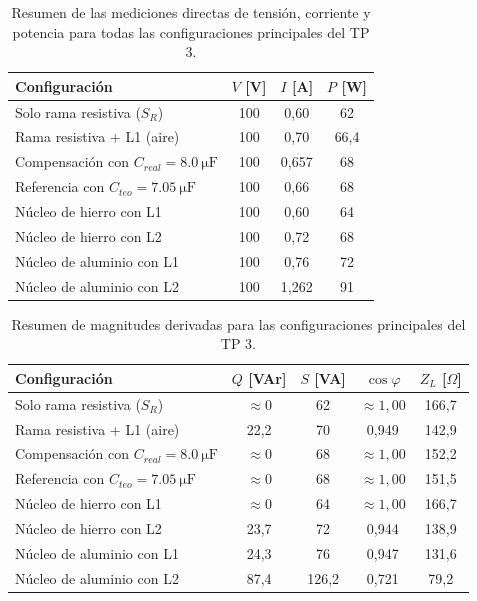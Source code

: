 \documentclass[a4paper,12pt]{article}
\begin{document}
\begin{table}[H]
    \centering
    \caption{Resumen de las mediciones directas de tensión, corriente y potencia para todas las configuraciones principales del TP 3.}
    \label{tab:tp3_resumen_directas}
    \begin{tabular}{>{\raggedright\arraybackslash}p{}ccc}
        \toprule
        Configuración & $V$ [V] & $I$ [A] & $P$ [W] \\
        \midrule
        Solo rama resistiva ($S_R$) & 100 & 0,60 & 62 \\
        Rama resistiva + L1 (aire) & 100 & 0,70 & 66,4 \\
        Compensación con $C_{real}=\SI{8,0}{\micro\farad}$ & 100 & 0,657 & 68 \\
        Referencia con $C_{teo}=\SI{7,05}{\micro\farad}$ & 100 & 0,66 & 68 \\
        Núcleo de hierro con L1 & 100 & 0,60 & 64 \\
        Núcleo de hierro con L2 & 100 & 0,72 & 68 \\
        Núcleo de aluminio con L1 & 100 & 0,76 & 72 \\
        Núcleo de aluminio con L2 & 100 & 1,262 & 91 \\
        \bottomrule
    \end{tabular}
\end{table}

\begin{table}[H]
    \centering
    \caption{Resumen de magnitudes derivadas para las configuraciones principales del TP 3.}
    \label{tab:tp3_resumen_indirectas}
    \begin{tabular}{>{\raggedright\arraybackslash}p{}cccc}
        \toprule
        Configuración & $Q$ [VAr] & $S$ [VA] & $\cos\varphi$ & $Z_L$ [$\Omega$] \\
        \midrule
        Solo rama resistiva ($S_R$) & $\approx 0$ & 62 & $\approx 1,00$ & 166,7 \\
        Rama resistiva + L1 (aire) & 22,2 & 70 & 0,949 & 142,9 \\
        Compensación con $C_{real}=\SI{8,0}{\micro\farad}$ & $\approx 0$ & 68 & $\approx 1,00$ & 152,2 \\
        Referencia con $C_{teo}=\SI{7,05}{\micro\farad}$ & $\approx 0$ & 68 & $\approx 1,00$ & 151,5 \\
        Núcleo de hierro con L1 & $\approx 0$ & 64 & $\approx 1,00$ & 166,7 \\
        Núcleo de hierro con L2 & 23,7 & 72 & 0,944 & 138,9 \\
        Núcleo de aluminio con L1 & 24,3 & 76 & 0,947 & 131,6 \\
        Núcleo de aluminio con L2 & 87,4 & 126,2 & 0,721 & 79,2 \\
        \bottomrule
    \end{tabular}
\end{table}
\end{document}
